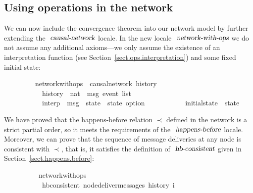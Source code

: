 \subsection{Using operations in the network}\label{sect.network.ops}

We can now include the convergence theorem into our network model by further extending the $\isa{causal-network}$ locale.
In the new locale $\isa{network-with-ops}$ we do not assume any additional axioms---we only assume the existence of an interpretation function (see Section~\ref{sect.ops.interpretation}) and some fixed initial state:
\vspace{0.375em}
\begin{isabellebody}
\ \ \ \ \ \ \ \ \ network{\isacharunderscore}with{\isacharunderscore}ops\ {\isacharequal}\ causal{\isacharunderscore}network\ history\isanewline
\ \ \ \ \ \ \ \ \ \ \ history\ {\isacharcolon}{\isacharcolon}\ {\isachardoublequoteopen}nat\ {\isasymRightarrow}\ {\isacharprime}msg\ event\ list{\isachardoublequoteclose}\ {\isacharplus}\isanewline
\ \ \ \ \ \ \ \ \ \ \ interp\ {\isacharcolon}{\isacharcolon}\ {\isachardoublequoteopen}{\isacharprime}msg\ {\isasymRightarrow}\ {\isacharprime}state\ {\isasymRightarrow}\ {\isacharprime}state\ option{\isachardoublequoteclose}\isanewline
\ \ \ \ \ \ \ \ \ \ \ initial{\isacharunderscore}state\ {\isacharcolon}{\isacharcolon}\ {\isachardoublequoteopen}{\isacharprime}state{\isachardoublequoteclose}
\end{isabellebody}
\vspace{0.375em}
We have proved that the happens-before relation $\prec$ defined in the network is a strict partial order, so it meets the requirements of the $\isa{happens-before}$ locale.
Moreover, we can prove that the sequence of message deliveries at any node is consistent with $\prec$, that is, it satisfies the definition of $\isa{hb-consistent}$ given in Section~\ref{sect.happens.before}:
\vspace{0.375em}
\begin{isabellebody}
\ \ \ \ \ \ \ \ \ {\isacharparenleft}\ network{\isacharunderscore}with{\isacharunderscore}ops{\isacharparenright}\isanewline
\ \ \ \ \ \ \ \ \ \ \ {\isachardoublequoteopen}hb{\isacharunderscore}consistent\ {\isacharparenleft}node{\isacharunderscore}deliver{\isacharunderscore}messages\ {\isacharparenleft}history\ i{\isacharparenright}{\isacharparenright}{\isachardoublequoteclose}
\end{isabellebody}
